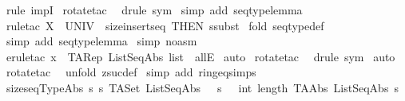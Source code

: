 \begin{isabellebody}
\isamarkupfalse%
\ {\isacharparenleft}rule\ impI{\isacharparenright}\isanewline
{}\isamarkupfalse%
\ {\isacharparenleft}rotate{\isacharunderscore}tac\ {\isacharminus}{}{\isacharparenright}\isanewline
{}\isamarkupfalse%
\ {\isacharparenleft}drule\ sym{\isacharparenright}\isanewline
{}\isamarkupfalse%
\ {\isacharparenleft}simp\ add{\isacharcolon}\ seqtype{\isacharunderscore}lemma{\isacharparenright}\isanewline
{}\isamarkupfalse%
\ {\isacharparenleft}rule{\isacharunderscore}tac\ X{}\ {\isacharequal}\ {\isachardoublequoteopen}UNIV{\isachardoublequoteclose}\ \ size{\isacharunderscore}insert{\isacharunderscore}seq\ {\isacharbrackleft}THEN\ ssubst{\isacharbrackright}{\isacharparenright}\isanewline
{}\isamarkupfalse%
\ {\isacharparenleft}fold\ seqtype{\isacharunderscore}def{\isacharparenright}\isanewline
{}\isamarkupfalse%
\ {\isacharparenleft}simp\ add{\isacharcolon}\ seqtype{\isacharunderscore}lemma{\isacharparenright}\isanewline
{}\isamarkupfalse%
\ {\isacharparenleft}simp\ {\isacharparenleft}no{\isacharunderscore}asm{\isacharparenright}{\isacharparenright}\isanewline
{}\isamarkupfalse%
\ {\isacharparenleft}erule{\isacharunderscore}tac\ x\ {\isacharequal}\ {\isachardoublequoteopen}TARep\ ListSeqAbs\ list{\isachardoublequoteclose}\ \ allE{\isacharparenright}\isanewline
{}\isamarkupfalse%
\ auto\isanewline
{}\isamarkupfalse%
\ {\isacharparenleft}rotate{\isacharunderscore}tac\ {}{\isacharparenright}\isanewline
{}\isamarkupfalse%
\ {\isacharparenleft}drule\ sym{\isacharparenright}\isanewline
{}\isamarkupfalse%
\ auto\isanewline
{}\isamarkupfalse%
\ {\isacharparenleft}rotate{\isacharunderscore}tac\ {}{\isacharparenright}\isanewline
{}\isamarkupfalse%
\ {\isacharparenleft}unfold\ zsuc{\isacharunderscore}def{\isacharparenright}\isanewline
{}\isamarkupfalse%
\ {\isacharparenleft}simp\ add{\isacharcolon}\ ring{\isacharunderscore}eq{\isacharunderscore}simps{\isacharparenright}\isanewline
{}\isamarkupfalse%
%
\endisatagproof
{\isafoldproof}%
%
\isadelimproof
\isanewline
%
\endisadelimproof
\isanewline
{}\isamarkupfalse%
\ sizeseq{\isacharunderscore}TypeAbs{\isacharcolon}\ {\isachardoublequoteopen}{\isacharbang}{\isacharbang}s{\isachardot}\ s{\isacharcolon}\ TASet\ ListSeqAbs\ {\isacharequal}{\isacharequal}{\isachargreater}\ {\isacharparenleft}{\isacharhash}\ s{\isacharparenright}\ \ {\isacharequal}\ int\ {\isacharparenleft}length\ {\isacharparenleft}TAAbs\ ListSeqAbs\ s{\isacharparenright}{\isacharparenright}{\isachardoublequoteclose}\isanewline

\end{isabellebody}
